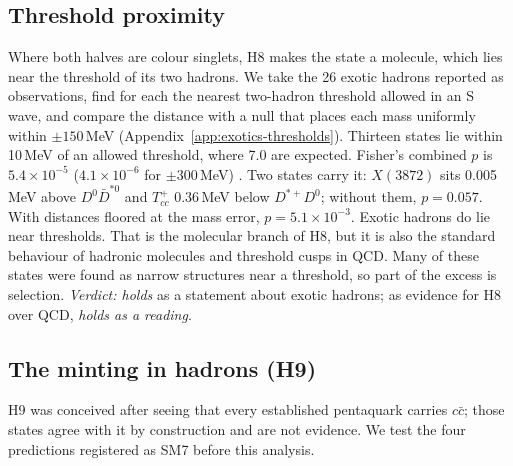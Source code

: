 \subsection{Threshold proximity}\label{sec:exotics-thresholds}

Where both halves are colour singlets, H8 makes the state a molecule, which lies near the threshold of its two hadrons. We take the 26
exotic hadrons reported as observations, find for each the nearest two-hadron threshold allowed in an S wave, and compare the distance
with a null that places each mass uniformly within $\pm150$\,MeV (Appendix~\ref{app:exotics-thresholds}). Thirteen states lie within
10\,MeV of an allowed threshold, where 7.0 are expected. Fisher's combined $p$ is $5.4\times10^{-5}$ ($4.1\times10^{-6}$ for
$\pm300$\,MeV) . Two states carry it: $X(3872)$ sits 0.005\,MeV above $D^0\bar D^{*0}$ and $T_{cc}^+$ 0.36\,MeV below
$D^{*+}D^0$; without them, $p=0.057$. With distances floored at the mass error, $p=5.1\times10^{-3}$. Exotic hadrons do lie near
thresholds. That is the molecular branch of H8, but it is also the standard behaviour of hadronic molecules and threshold cusps in QCD.
Many of these states were found as narrow structures near a threshold, so part of the excess is selection. \emph{Verdict: holds} as a
statement about exotic hadrons; as evidence for H8 over QCD, \emph{holds as a reading}.

\subsection{The minting in hadrons (H9)}\label{sec:exotics-mint}

H9 was conceived after seeing that every established pentaquark carries $c\bar c$; those states agree with it by construction and are
not evidence. We test the four predictions registered as SM7 before this analysis.

